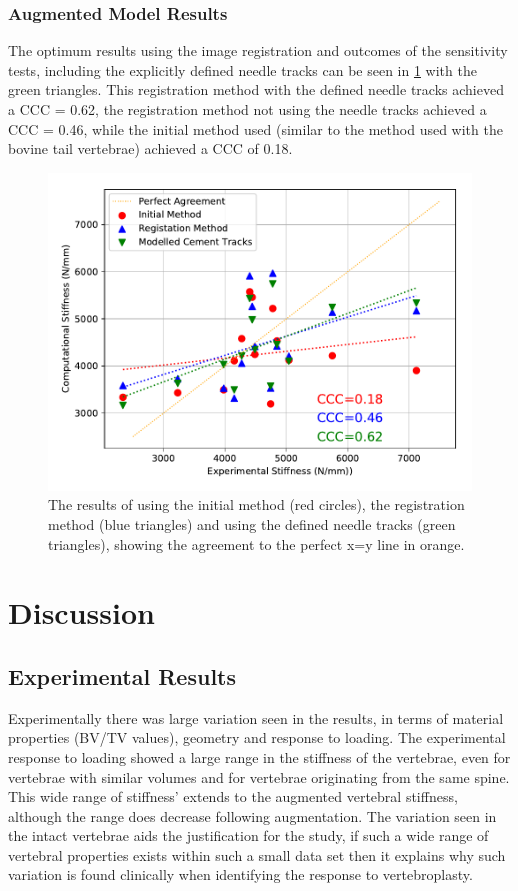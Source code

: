 \subsubsection{Augmented Model Results}

The optimum results using the image registration and outcomes of the
sensitivity tests, including the explicitly defined needle tracks can be seen
in \cref{fig:aug_init_vs_best} with the green triangles.  This registration
method with the defined needle tracks achieved a CCC = 0.62, the registration
method not using the needle tracks achieved a CCC = 0.46, while the initial
method used (similar to the method used with the bovine tail vertebrae)
achieved a CCC of 0.18.

\begin{figure}[h!]
  \centering
	\includegraphics[width=.65\textwidth, angle=270]{Chapters/Chapter_HT_images/aug_init_vs_best_vs_ndl_trcks}
	\caption{The results of using the initial method (red circles), the registration method (blue triangles) and using the defined needle tracks (green triangles), showing the agreement to the perfect x=y line in orange.}
	\label{fig:aug_init_vs_best}
\end{figure}


\section{Discussion}

\subsection{Experimental Results}

Experimentally there was large variation seen in the results, in terms of
material properties (BV/TV values), geometry and response to loading.  The
experimental response to loading showed a large range in the stiffness of the
vertebrae, even for vertebrae with similar volumes and for vertebrae
originating from the same spine.  This wide range of stiffness' extends to the
augmented vertebral stiffness, although the range does decrease following
augmentation.  The variation seen in the intact vertebrae aids the
justification for the study, if such a wide range of vertebral properties
exists within such a small data set then it explains why such variation is
found clinically when identifying the response to vertebroplasty.

